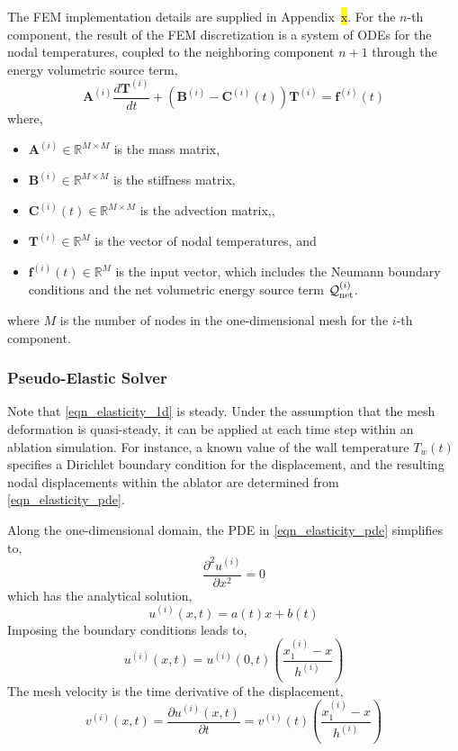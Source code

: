 The FEM implementation details are supplied in Appendix~\hl{x}. For the $n$-th component, the result of the FEM discretization is a system of ODEs for the nodal temperatures, coupled to the neighboring component $n+1$ through the energy volumetric source term,
\begin{equation}
    \mathbf{A}^{(i)}\frac{d\mathbf{T}^{(i)}}{dt} + \left(\mathbf{B}^{(i)} - \mathbf{C}^{(i)}(t)\right)\mathbf{T}^{(i)} = \mathbf{f}^{(i)}(t)
\end{equation}
where,
\begin{itemize}
    \item $\mathbf{A}^{(i)}\in\mathbb{R}^{M\times M}$ is the mass matrix,
    \item $\mathbf{B}^{(i)}\in\mathbb{R}^{M\times M}$ is the stiffness matrix,
    \item $\mathbf{C}^{(i)}(t)\in\mathbb{R}^{M\times M}$ is the advection matrix,,
    \item $\mathbf{T}^{(i)}\in\mathbb{R}^{M}$ is the vector of nodal temperatures, and
    \item $\mathbf{f}^{(i)}(t)\in\mathbb{R}^{M}$ is the input vector, which includes the Neumann boundary conditions and the net volumetric energy source term $\mathcal{Q}^{(i)}_{\text{net}}$.
\end{itemize}
where $M$ is the number of nodes in the one-dimensional mesh for the $i$-th component.

\subsubsection{Pseudo-Elastic Solver}

Note that \cref{eqn_elasticity_1d} is steady. Under the assumption that the mesh deformation is quasi-steady, it can be applied at each time step within an ablation simulation. For instance, a known value of the wall temperature $T_w(t)$ specifies a Dirichlet boundary condition for the displacement, and the resulting nodal displacements within the ablator are determined from \cref{eqn_elasticity_pde}.

Along the one-dimensional domain, the PDE in \cref{eqn_elasticity_pde} simplifies to,
\begin{equation}
    \frac{\partial^2 u^{(i)}}{\partial x^2} = 0
\end{equation}
which has the analytical solution,
\begin{equation}
    u^{(i)}(x,t) = a(t)x + b(t)
\end{equation}
Imposing the boundary conditions leads to,
\begin{equation}
    u^{(i)}(x,t) = u^{(i)}(0,t)\left(\frac{x_1^{(i)} - x}{h^{(i)}}\right)
\end{equation}
The mesh velocity is the time derivative of the displacement,
\begin{equation}
    v^{(i)}(x,t) = \frac{\partial u^{(i)}(x,t)}{\partial t} = v^{(i)}(t)\left(\frac{x_1^{(i)} - x}{h^{(i)}}\right)
\end{equation}

